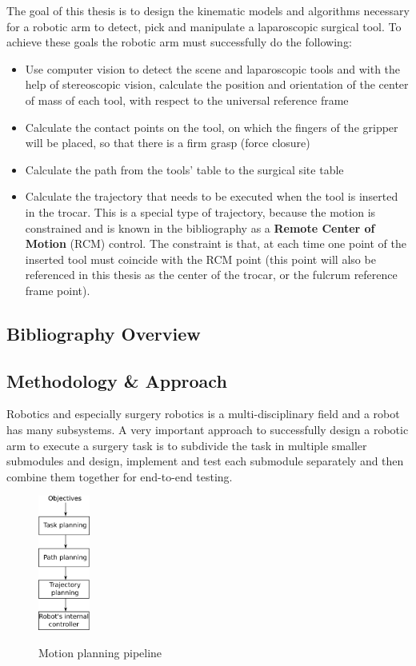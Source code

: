 The goal of this thesis is to design the kinematic models and algorithms necessary for a robotic arm to detect, pick and manipulate a laparoscopic surgical tool. To achieve these goals the robotic arm must 
successfully do the following:
\begin{itemize}
\item Use computer vision to detect the scene and laparoscopic tools and with the help of stereoscopic vision, calculate the position and orientation of the center of mass of each tool, with respect to the 
universal reference frame
\item Calculate the contact points on the tool, on which the fingers of the gripper will be placed, so that there is a firm grasp (force closure)
\item Calculate the path from the tools' table to the surgical site table
\item Calculate the trajectory that needs to be executed when the tool is inserted in the trocar. This is a special type of trajectory, because the motion is constrained and is known in the bibliography as
a \textbf{Remote Center of Motion} (RCM) control. The constraint is that, at each time one point of the inserted tool must coincide with the RCM point (this point will also be referenced in this thesis as the center of the 
trocar, or the fulcrum reference frame point).
\end{itemize}

\subsection{Bibliography Overview}

\subsection{Methodology \& Approach}

Robotics and especially surgery robotics is a multi-disciplinary field and a robot has many subsystems. A very important approach to successfully design a robotic arm to execute a surgery task is to subdivide the 
task in multiple smaller submodules and design, implement and test each submodule separately and then combine them together for end-to-end testing.

\begin{center}
\begin{figure}[H]
\centering
\includegraphics[width=0.15\textwidth]{images/motion-planning.png}\\
\caption{Motion planning pipeline}
\end{figure}
\end{center}

